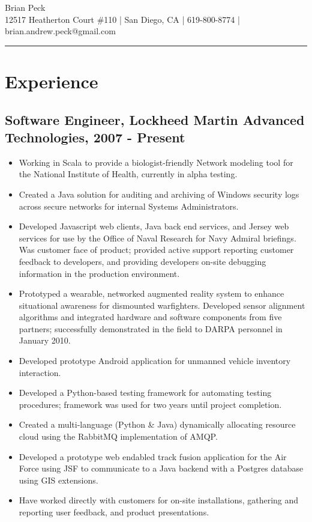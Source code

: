\documentclass[11pt]{article}
\title{}
\date{}
\begin{document}
\begin{center}
{\huge Brian Peck} \\
12517 Heatherton Court \#110 | San Diego, CA | 619-800-8774 | brian.andrew.peck@gmail.com
\hrule
\end{center}

\section*{Experience}
\label{sec-1}

\subsection*{Software Engineer, Lockheed Martin Advanced Technologies, 2007 - Present}
\label{sec-1.1}

\begin{itemize}
\item Working in Scala to provide a biologist-friendly Network modeling tool for the National Institute of Health, currently in alpha testing.
\item Created a Java solution for auditing and archiving of Windows security logs across secure networks for internal Systems Administrators.
\item Developed Javascript web clients, Java back end services, and Jersey web services for use by the Office of Naval Research for Navy Admiral briefings.  Was customer face of product; provided active support reporting customer feedback to developers, and providing developers on-site debugging information in the production environment.
\item Prototyped a wearable, networked augmented reality system to enhance situational awareness for dismounted warfighters.  Developed sensor alignment algorithms and integrated hardware and software components from five partners; successfully demonstrated in the field to DARPA personnel in January 2010.
\item Developed prototype Android application for unmanned vehicle inventory interaction.
\item Developed a Python-based testing framework for automating testing procedures; framework was used for two years until project completion.
\item Created a multi-language (Python \& Java) dynamically allocating resource cloud using the RabbitMQ implementation of AMQP.
\item Developed a prototype web endabled track fusion application for the Air Force using JSF to communicate to a Java backend with a Postgres database using GIS extensions.
\item Have worked directly with customers for on-site installations, gathering and reporting user feedback, and product presentations.
\end{itemize}
\end{document}
